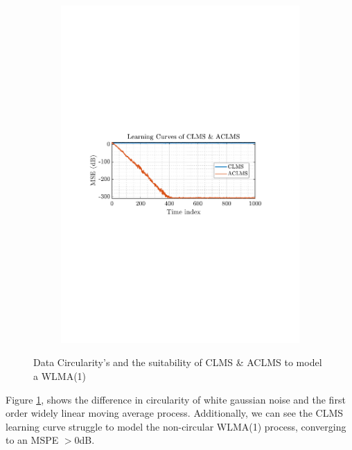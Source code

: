 \documentclass[12pt]{article}
\numberwithin{equation}{section}
\begin{document}
\begin{figure}[H]
\begin{subfigure}{0.49\textwidth}
					\includegraphics[trim={2.2cm 11.2cm 3.00cm  11.2cm}, clip, width=\textwidth]{../MATLAB/figures/q3_1a_fig02.pdf} 
					\captionsetup{justification=centering}
				\end{subfigure}
				
				\captionsetup{justification=centering}
				\caption{Data Circularity's and the suitability of CLMS \& ACLMS to model a WLMA(1) }
				\label{fig: 3-1a}
			\end{figure}
			
			Figure \ref{fig: 3-1a}, shows the difference in circularity of white gaussian noise and the first order widely linear moving average process. Additionally, we can see the CLMS learning curve struggle to model the non-circular WLMA(1) process, converging to an MSPE $>0$dB.
			
\end{document}
